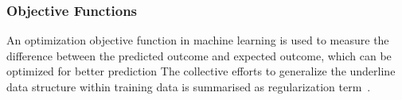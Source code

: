 \subsubsection{Objective Functions}
An optimization objective function in machine learning is used to measure the difference between the predicted outcome and expected outcome, which can be optimized for better prediction The collective efforts to generalize the underline data structure within training data is summarised as regularization term~\cite{goodfellow_2015}.  